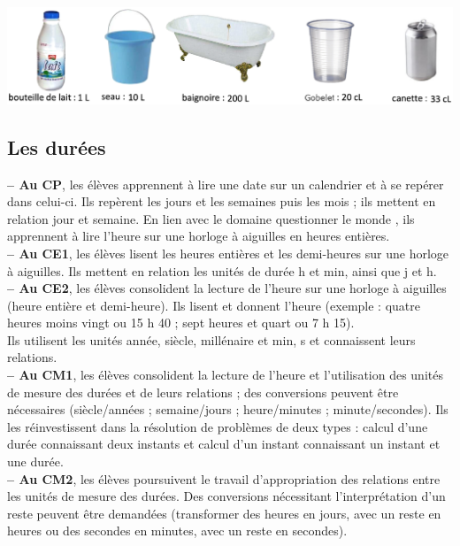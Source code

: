 {\begin{center}
   \includegraphics[width=17cm]{Grandeurs_mesures_did/Images/Grm7_cours_contenances}
\end{center}


\subsection{Les durées} %

{\bf -- Au CP}, les élèves apprennent à lire une date sur un calendrier et à se repérer dans celui-ci. Ils repèrent les jours et les semaines puis les mois ; ils mettent en relation jour et semaine. En lien avec le domaine \og questionner le monde \fg, ils apprennent à lire l’heure sur une horloge à aiguilles en heures entières. \\
{\bf -- Au CE1}, les élèves lisent les heures entières et les demi-heures sur une horloge à aiguilles. Ils mettent en relation les unités de durée h et min, ainsi que j et h. \\
{\bf -- Au CE2}, les élèves consolident la lecture de l’heure sur une horloge à aiguilles (heure entière et demi-heure). Ils lisent et donnent l’heure (exemple : \og quatre heures moins vingt \fg{} ou 15 h 40 ; \og sept heures et quart \fg{} ou 7 h 15). \\
Ils utilisent les unités année, siècle, millénaire et  min, s et connaissent leurs relations. \\
{\bf -- Au CM1}, les élèves consolident la lecture de l’heure et l’utilisation des unités de mesure des durées et de leurs relations ; des conversions peuvent être nécessaires (siècle/années ; semaine/jours ; heure/minutes ; minute/secondes). Ils les réinvestissent dans la résolution de problèmes de deux types : calcul d’une durée connaissant deux instants et calcul d’un instant connaissant un instant et une durée. \\
{\bf -- Au CM2}, les élèves poursuivent le travail d’appropriation des relations entre les unités de mesure des durées. Des conversions nécessitant l’interprétation d’un reste peuvent être demandées (transformer des heures en jours, avec un reste en heures ou des secondes en minutes, avec un reste en secondes). \medskip

}

